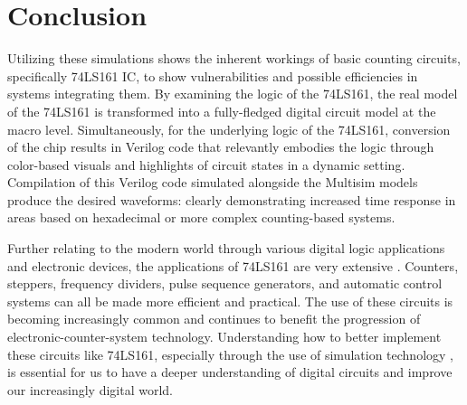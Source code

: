 \documentclass[conference]{IEEEtran}
\begin{document}
\section{Conclusion}
Utilizing these simulations shows the inherent workings of basic counting circuits, specifically 74LS161 IC, to show vulnerabilities and possible efficiencies in systems integrating them. By examining the logic of the 74LS161, the real model of the 74LS161 is transformed into a fully-fledged digital circuit model at the macro level. Simultaneously, for the underlying logic of the 74LS161, conversion of the chip results in Verilog code that relevantly embodies the logic through color-based visuals and highlights of circuit states in a dynamic setting. Compilation of this Verilog code simulated alongside the Multisim models produce the desired waveforms: clearly demonstrating increased time response in areas based on hexadecimal or more complex counting-based systems.

Further relating to the modern world through various digital logic applications and electronic devices, the applications of 74LS161 are very extensive \cite{Bao2021}. Counters, steppers, frequency dividers, pulse sequence generators, and automatic control systems can all be made more efficient and practical. The use of these circuits is becoming increasingly common and continues to benefit the progression of electronic-counter-system technology. Understanding how to better implement these circuits like 74LS161, especially through the use of simulation technology \cite{Deng2012}, is essential for us to have a deeper understanding of digital circuits and improve our increasingly digital world.
\end{document}
